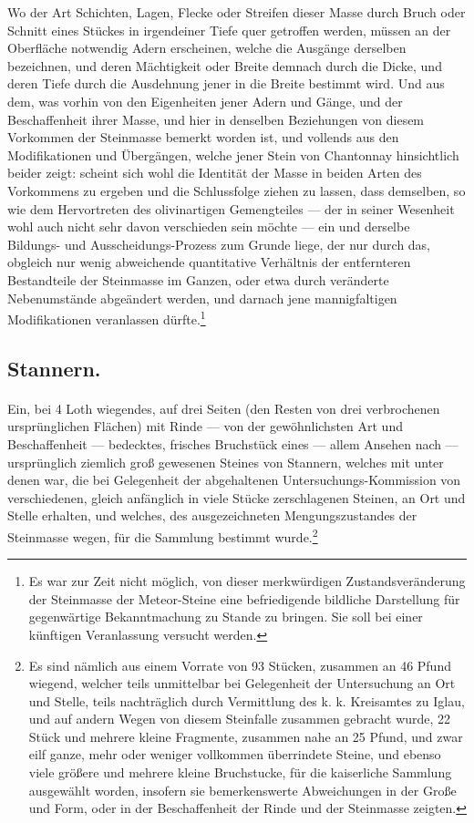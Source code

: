\documentclass[a4paper, 11pt, oneside, german]{article}
\begin{document}
Wo der Art Schichten, Lagen, Flecke oder Streifen dieser Masse durch Bruch oder Schnitt eines Stückes in irgendeiner Tiefe quer getroffen werden, müssen an der Oberfläche notwendig Adern erscheinen, welche die Ausgänge derselben bezeichnen, und deren Mächtigkeit oder Breite demnach durch die Dicke, und deren Tiefe durch die Ausdehnung jener in die Breite bestimmt wird. Und aus dem, was vorhin von den Eigenheiten jener Adern und Gänge, und der Beschaffenheit ihrer Masse, und hier in denselben Beziehungen von diesem Vorkommen der Steinmasse bemerkt worden ist, und vollends aus den Modifikationen und Übergängen, welche jener Stein von Chantonnay hinsichtlich beider zeigt: scheint sich wohl die Identität der Masse in beiden Arten des Vorkommens zu ergeben und die Schlussfolge ziehen zu lassen, dass demselben, so wie dem Hervortreten des olivinartigen Gemengteiles --- der in seiner Wesenheit wohl auch nicht sehr davon verschieden sein möchte --- ein und derselbe Bildungs- und Ausscheidungs-Prozess zum Grunde liege, der nur durch das, obgleich nur wenig abweichende quantitative Verhältnis der entfernteren Bestandteile der Steinmasse im Ganzen, oder etwa durch veränderte Nebenumstände abgeändert werden, und darnach jene mannigfaltigen Modifikationen veranlassen dürfte.\footnote{Es war zur Zeit nicht möglich, von dieser merkwürdigen Zustandsveränderung der Steinmasse der Meteor-Steine eine befriedigende bildliche Darstellung für gegenwärtige Bekanntmachung zu Stande zu bringen. Sie soll bei einer künftigen Veranlassung versucht werden.}

\subsection{Stannern.}
\paragraph{}
Ein, bei 4 Loth wiegendes, auf drei Seiten (den Resten von drei verbrochenen ursprünglichen Flächen) mit Rinde --- von der gewöhnlichsten Art und Beschaffenheit --- bedecktes, frisches Bruchstück eines --- allem Ansehen nach --- ursprünglich ziemlich groß gewesenen Steines von Stannern, welches mit unter denen war, die bei Gelegenheit der abgehaltenen Untersuchungs-Kommission von verschiedenen, gleich anfänglich in viele Stücke zerschlagenen Steinen, an Ort und Stelle erhalten, und welches, des ausgezeichneten Mengungszustandes der Steinmasse wegen, für die Sammlung bestimmt wurde.\footnote{Es sind nämlich aus einem Vorrate von 93 Stücken, zusammen an 46 Pfund wiegend, welcher teils unmittelbar bei Gelegenheit der Untersuchung an Ort und Stelle, teils nachträglich durch Vermittlung des k. k. Kreisamtes zu Iglau, und auf andern Wegen von diesem Steinfalle zusammen gebracht wurde, 22 Stück und mehrere kleine Fragmente, zusammen nahe an 25 Pfund, und zwar eilf ganze, mehr oder weniger vollkommen überrindete Steine, und ebenso viele größere und mehrere kleine Bruchstucke, für die kaiserliche Sammlung ausgewählt worden, insofern sie bemerkenswerte Abweichungen in der Große und Form, oder in der Beschaffenheit der Rinde und der Steinmasse zeigten.}
\end{document}

